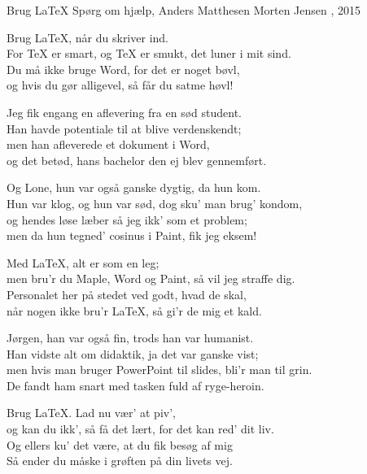 \begin{song}{Brug \LaTeX}
  {} %
  {Spørg om hjælp, Anders Matthesen}
  {Morten Jensen}
  {\TKET{}, 2015}
  {\NotCCLIed}

  \begin{SBChorus}
    Brug \LaTeX, når du skriver ind.\\
    For \TeX{} er smart, og \TeX{} er smukt, det luner i mit sind.\\
    Du må ikke bruge Word, for det er noget bøvl,\\
    og hvis du gør alligevel, så får du satme høvl!
  \end{SBChorus}

  \begin{SBVerse}
    Jeg fik engang en aflevering fra en sød student.\\
    Han havde potentiale til at blive verdenskendt;\\
    men han afleverede et dokument i Word,\\
    og det betød, hans bachelor den ej blev gennemført.
  \end{SBVerse}

  \begin{SBVerse}
    Og Lone, hun var også ganske dygtig, da hun kom.\\
    Hun var klog, og hun var sød, dog sku’ man brug’ kondom,\\
    og hendes løse læber så jeg ikk’ som et problem;\\
    men da hun tegned’ cosinus i Paint, fik jeg eksem!
  \end{SBVerse}

  \begin{SBChorus}
    Med \LaTeX, alt er som en leg;\\
    men bru’r du Maple, Word og Paint, så vil jeg straffe dig.\\
    Personalet her på stedet ved godt, hvad de skal,\\
    når nogen ikke bru’r \LaTeX, så gi’r de mig et kald.
  \end{SBChorus}

  \begin{SBVerse}
    Jørgen, han var også fin, trods han var humanist.\\
    Han vidste alt om didaktik, ja det var ganske vist;\\
    men hvis man bruger PowerPoint til slides, bli’r man til grin.\\
    De fandt ham snart med tasken fuld af ryge-heroin.
  \end{SBVerse}

  \begin{SBChorus}
    Brug \LaTeX. Lad nu vær’ at piv’,\\
    og kan du ikk’, så få det lært, for det kan red’ dit liv.\\
    Og ellers ku’ det være, at du fik besøg af mig\\
    Så ender du måske i grøften på din livets vej.
  \end{SBChorus}
\end{song}
